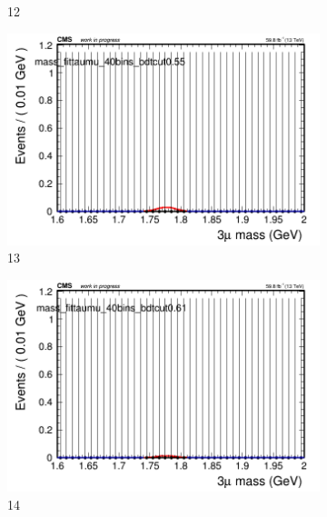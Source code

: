 \begin{figure}[h!]
\begin{subfigure}{0.2\textwidth}
        \caption{12}
    \end{subfigure}
    \begin{subfigure}{0.2\textwidth}
        \includegraphics[width=\textwidth]{unfixed_exp/plots/taumu/massfit_taumu_40bins_bdtcut0.55.png}
        \caption{13}
    \end{subfigure}
    \begin{subfigure}{0.2\textwidth}
        \includegraphics[width=\textwidth]{unfixed_exp/plots/taumu/massfit_taumu_40bins_bdtcut0.61.png}
        \caption{14}
    \end{subfigure}
    \begin{subfigure}{0.2\textwidth}

\end{subfigure}
\end{figure}
